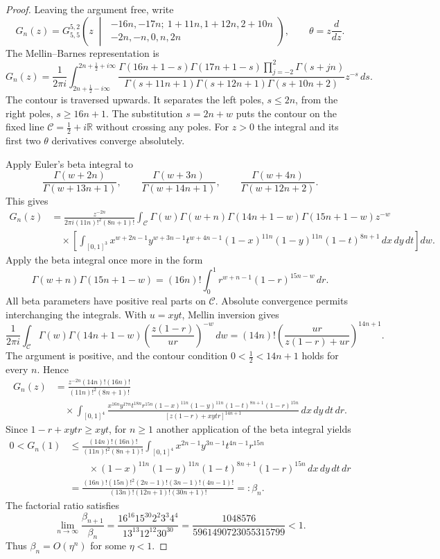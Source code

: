\documentclass[oneside,english,11pt]{amsart}
\begin{document}
\begin{proof}
Leaving the argument free, write
\[
G_n(z)=G_{5,5}^{5,2}\!\left(
z\;\middle|\;
\begin{matrix}
-16n,-17n;\ 1+11n,1+12n,2+10n\\
-2n,-n,0,n,2n
\end{matrix}\right),
\qquad \theta=z\frac{d}{dz}.
\]
The Mellin--Barnes representation \cite[Eq.~16.17.1]{NIST:DLMF} is
\[
G_n(z)=\frac{1}{2\pi i}
\int_{2n+\frac12-i\infty}^{2n+\frac12+i\infty}
\frac{\Gamma(16n+1-s)\Gamma(17n+1-s)
      \prod_{j=-2}^{2}\Gamma(s+jn)}
     {\Gamma(s+11n+1)\Gamma(s+12n+1)\Gamma(s+10n+2)}
z^{-s}\,ds.
\]
The contour is traversed upwards. It separates the left poles,
$s\leq2n$, from the right poles, $s\geq16n+1$.
The substitution $s=2n+w$ puts the contour on the fixed line
$\mathcal C=\tfrac12+i\mathbb R$ without crossing any poles.
For $z>0$ the integral and its first two $\theta$ derivatives
converge absolutely.

Apply Euler's beta integral \cite[Eq.~5.12.1]{NIST:DLMF} to
\[
\frac{\Gamma(w+2n)}{\Gamma(w+13n+1)},\qquad
\frac{\Gamma(w+3n)}{\Gamma(w+14n+1)},\qquad
\frac{\Gamma(w+4n)}{\Gamma(w+12n+2)}.
\]
This gives
\[
\begin{aligned}
G_n(z)
&=\frac{z^{-2n}}{2\pi i(11n)!^2(8n+1)!}
\int_{\mathcal C}
\Gamma(w)\Gamma(w+n)\Gamma(14n+1-w)\Gamma(15n+1-w)z^{-w}\\
&\quad\times\left[\int_{[0,1]^3}
x^{w+2n-1}y^{w+3n-1}t^{w+4n-1}
(1-x)^{11n}(1-y)^{11n}(1-t)^{8n+1}
\,dx\,dy\,dt\right]dw.
\end{aligned}
\]
Apply the beta integral once more in the form
\[
\Gamma(w+n)\Gamma(15n+1-w)
=(16n)!\int_0^1r^{w+n-1}(1-r)^{15n-w}\,dr.
\]
All beta parameters have positive real parts on $\mathcal C$.
Absolute convergence permits interchanging the integrals.
With $u=xyt$, Mellin inversion \cite[Eq.~5.13.1]{NIST:DLMF} gives
\[
\frac{1}{2\pi i}\int_{\mathcal C}
\Gamma(w)\Gamma(14n+1-w)
\left(\frac{z(1-r)}{ur}\right)^{-w}\,dw
=(14n)!\left(\frac{ur}{z(1-r)+ur}\right)^{14n+1}.
\]
The argument is positive, and the contour condition
$0<\tfrac12<14n+1$ holds for every $n$. Hence
\[
\begin{aligned}
G_n(z)&=\frac{z^{-2n}(14n)!(16n)!}{(11n)!^2(8n+1)!}\\
&\quad\times\int_{[0,1]^4}
\frac{x^{16n}y^{17n}t^{18n}r^{15n}
 (1-x)^{11n}(1-y)^{11n}(1-t)^{8n+1}(1-r)^{15n}}
 {[z(1-r)+xytr]^{14n+1}}
\,dx\,dy\,dt\,dr.
\end{aligned}
\]
Since $1-r+xytr\geq xyt$, for $n\geq1$ another application of
the beta integral yields
\[
\begin{aligned}
0<G_n(1)
&\leq\frac{(14n)!(16n)!}{(11n)!^2(8n+1)!}
\int_{[0,1]^4}
x^{2n-1}y^{3n-1}t^{4n-1}r^{15n}\\
&\qquad\times
(1-x)^{11n}(1-y)^{11n}(1-t)^{8n+1}(1-r)^{15n}
\,dx\,dy\,dt\,dr\\
&=\frac{(16n)!(15n)!^2(2n-1)!(3n-1)!(4n-1)!}
        {(13n)!(12n+1)!(30n+1)!}
=:\beta_n.
\end{aligned}
\]
The factorial ratio satisfies
\[
\lim_{n\to\infty}\frac{\beta_{n+1}}{\beta_n}
=\frac{16^{16}15^{30}2^2 3^3 4^4}
       {13^{13}12^{12}30^{30}}
=\frac{1048576}{5961490723055315799}<1.
\]
Thus $\beta_n=O(\eta^n)$ for some $\eta<1$.


\end{proof}
\end{document}

